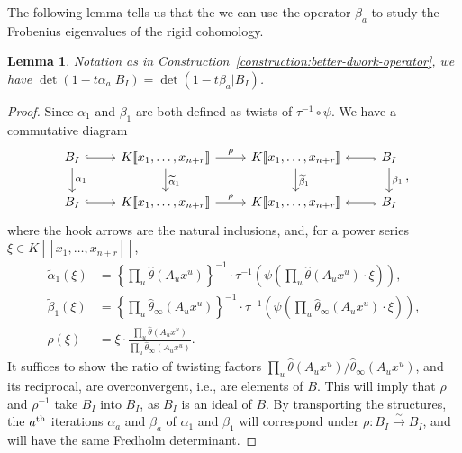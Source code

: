 \documentclass{amsart}
\numberwithin{equation}{section}
\theoremstyle{plain}
\newtheorem{lemma}[equation]{Lemma}
\theoremstyle{definition}
\begin{document}
The following lemma tells us that the we can use the operator
\(\beta_{a}\) to study the Frobenius eigenvalues of the rigid cohomology.

\begin{lemma}%
\label{lemma:same-fredholm-determinant}
Notation as in Construction~\ref{construction:better-dwork-operator},
we have \(\det(1 - t\alpha_{a}| B_{I}) = \det(1 - t\beta_{a} | B_{I})\).
\end{lemma}

\begin{proof}
Since \(\alpha_{1}\) and \(\beta_{1}\) are both defined as twists of
\(\tau^{-1}\circ\psi\).  We have a commutative diagram
\begin{equation*}
\begin{tikzcd}
B_I \ar[r,hook] \ar[d,"\alpha_{1}"]& K[\![x_1,\ldots,x_{n+r}]\!] \ar[r,"\rho"] \ar[d,"\widetilde{\alpha}_1"]
& K[\![x_1,\ldots,x_{n+r}]\!]  \ar[d,"\widetilde{\beta}_1"] & B_I \ar[l,hook]  \ar[d,"\beta_1"] \\
B_I \ar[r,hook] & K[\![x_1,\ldots,x_{n+r}]\!] \ar[r,"\rho"] & K[\![x_1,\ldots,x_{n+r}]\!] & B_{I} \ar[l,hook]
\end{tikzcd},
\end{equation*}
where the hook arrows are the natural inclusions, and,
for a power series \(\xi \in K[\![x_1,\ldots,x_{n+r}]\!]\),
\begin{align*}
  \widetilde{\alpha}_1(\xi) &= \left\{ \prod_{u}\widehat{\theta}(A_u x^u) \right\}^{-1}\cdot \tau^{-1}\left(\psi\left(\prod_{u}\widehat{\theta}(A_u x^u)\cdot \xi\right)\right),\\
  \widetilde{\beta}_1(\xi) &= \left\{ \prod_{u}\widehat{\theta}_{\infty}(A_u x^u) \right\}^{-1}\cdot \tau^{-1}\left(\psi\left(\prod_{u}\widehat{\theta}_{\infty}(A_u x^u)\cdot \xi\right)\right),\\
  \rho(\xi) &= \xi \cdot \frac{\prod_u \widehat{\theta}(A_u x^u)}{\prod_u \widehat{\theta}_{\infty}(A_u x^u)}.
\end{align*}
It suffices to show the ratio of twisting factors
\(\prod_{u}\widehat{\theta}(A_{u}x^{u})/\widehat{\theta}_{\infty}(A_{u}x^{u})\),
and its reciprocal, are overconvergent, i.e., are elements of \(B\).  This will imply that \(\rho\) and \(\rho^{-1}\)
take \(B_I\) into \(B_I\), as \(B_I\) is an ideal of \(B\).
By transporting the structures, the
\(a\textsuperscript{th}\) iterations \(\alpha_a\) and \(\beta_{a}\) of
\(\alpha_1\) and \(\beta_1\) will correspond under
\(\rho\colon B_I \xrightarrow{\sim} B_I\), and will have the same
Fredholm determinant.


\end{proof}
\end{document}
